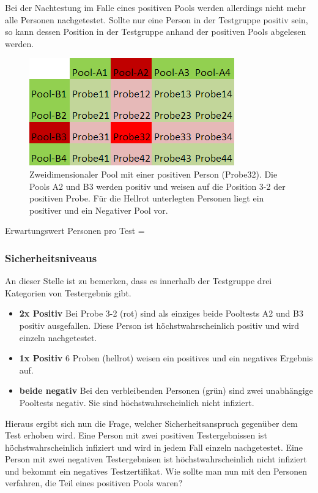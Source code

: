 Bei der Nachtestung im Falle eines positiven Pools werden allerdings nicht mehr alle Personen nachgetestet.
Sollte nur eine Person in der Testgruppe positiv sein, so kann dessen Position in der Testgruppe anhand der positiven Pools abgelesen werden.
\begin{figure}[h]
	\centering
	\includegraphics[height=.25\textwidth]{img/2d_Pool_1Positiv}
	\caption{Zweidimensionaler Pool mit einer positiven Person (Probe32). Die Pools A2 und B3 werden positiv und weisen auf die Position 3-2 der positiven Probe. Für die Hellrot unterlegten Personen liegt ein positiver und ein Negativer Pool vor.\footnotemark}
\end{figure}

Erwartungswert Personen pro Test =

\subsubsection{Sicherheitsniveaus}

An dieser Stelle ist zu bemerken, dass es innerhalb der Testgruppe drei Kategorien von Testergebnis gibt.
\begin{itemize}
	\item \textbf{2x Positiv} Bei Probe 3-2 (rot) sind als einziges beide Pooltests A2 und B3 positiv ausgefallen. Diese Person ist höchstwahrscheinlich positiv und wird einzeln nachgetestet.
	\item \textbf{1x Positiv} 6 Proben (hellrot) weisen ein positives und ein negatives Ergebnis auf.
	\item \textbf{beide negativ} Bei den verbleibenden Personen (grün) sind zwei unabhängige Pooltests negativ. Sie sind höchstwahrscheinlich nicht infiziert.
\end{itemize}
Hieraus ergibt sich nun die Frage, welcher Sicherheitsanspruch gegenüber dem Test erhoben wird.
Eine Person mit zwei positiven Testergebnissen ist höchstwahrscheinlich infiziert und wird in jedem Fall einzeln nachgetestet.
Eine Person mit zwei negativen Testergebnisen ist höchstwahrscheinlich nicht infiziert und bekommt ein negatives Testzertifikat.
Wie sollte man nun mit den Personen verfahren, die Teil eines positiven Pools waren?

